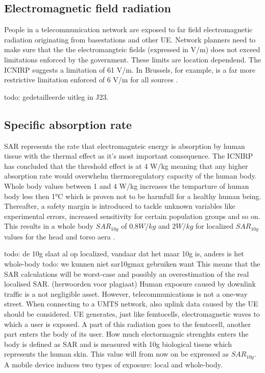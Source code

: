 \subsection{Electromagnetic field radiation} %
\label{sub:emf}
People in a telecommunication network are exposed to far field electromagnetic radiation originating from basestations and other \gls{UE}. 
Network planners need to make sure that the the electromangteic fields (expressed in V/m) does not exceed limitations enforced 
by the government. These limits are location dependend. The \gls{ICNIRP} suggests a limitation of 61 V/m. In Brussels, for example, 
is a far more restrictive limitation enforced of 6 V/m for all sources \cite{J1, J10_RDP}.

todo: gedetailleerde uitleg in J23.


\subsection{Specific absorption rate}

\gls{SAR} represents the rate that electromagnteic energy is absorption by human tissue with the thermal effect as it's most important consequence.
The \gls{ICNIRP} has concluded that the threshold effect is at 4 W/kg meaning that any higher absorption rate would overwhelm thermoregulatory capacity of the human body.
Whole body values between 1 and 4 W/kg increases the temparture of human body less then 1°C which is proven not to be harmfull for a healthy human being\cite{J24}.
Thereafter, a safety margin is introduced to tackle unknown variables like experimental errors, increased sensitivity for certain population groups and so on. This results 
in a whole body $SAR_{10g}$ of $0.8 W/kg$ and $2 W/kg$ for localized $SAR_{10g}$ values for the head and torso aera \cite{J23}.

todo: de 10g slaat al op localized, vandaar dat het maar 10g is, anders is het whole-body
todo: we kunnen niet sar10gmax gebruiken want This means that the SAR calculations will be worst-case and possibly an overestimation of the real localised SAR. (herwoorden voor plagiaat)
Human exposure caused by downlink traffic is a not negligible asset. However, telecommunications is not a one-way street. When connecting to a UMTS network, also uplink data caused by the \gls{UE} should be considered.
\gls{UE} generates, just like femtocells, electromagnetic waves to which a user is exposed. A part of this radiation goes to the femtocell, another part enters the body of its user. How much electormagnic strenghts enters the body is defined as \gls{SAR} and is measured with 10g biological tissue which represents the human skin. This value will from now on be expressed as $SAR_{10g}$. 
A mobile device induces two types of exposure: local and whole-body. 



